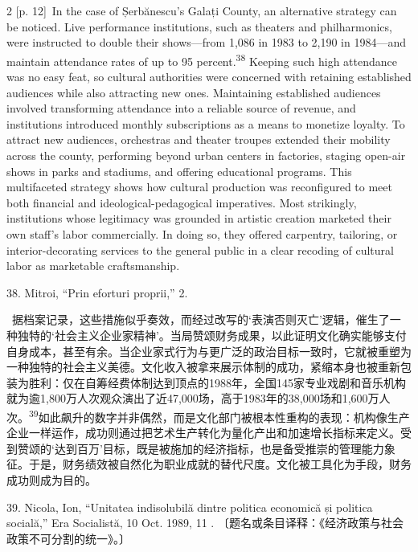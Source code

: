 \documentclass[10pt,a4paper]{article}
\begin{document}
\begin{paracol}{2}
{\scriptsize\color{gray} [p. 12]}\ In the case of Șerbănescu’s Galați County, an alternative strategy can be noticed. Live performance institutions, such as theaters and philharmonics, were instructed to double their shows—from 1,086 in 1983 to 2,190 in 1984—and maintain attendance rates of up to 95 percent.\nobreak\textsuperscript{38} Keeping such high attendance was no easy feat, so cultural authorities were concerned with retaining established audiences while also attracting new ones. Maintaining established audiences involved transforming attendance into a reliable source of revenue, and institutions introduced monthly subscriptions as a means to monetize loyalty. To attract new audiences, orchestras and theater troupes extended their mobility across the county, performing beyond urban centers in factories, staging open-air shows in parks and stadiums, and offering educational programs. This multifaceted strategy shows how cultural production was reconfigured to meet both financial and ideological-pedagogical imperatives. Most strikingly, institutions whose legitimacy was grounded in artistic creation marketed their own staff’s labor commercially. In doing so, they offered carpentry, tailoring, or interior-decorating services to the general public in a clear recoding of cultural labor as marketable craftsmanship.\par{\small 38. Mitroi, “Prin eforturi proprii,” 2.\par}
\switchcolumn*
{\scriptsize\color{gray} [p. 13]}\ 据档案记录，这些措施似乎奏效，而经过改写的‘表演否则灭亡’逻辑，催生了一种独特的‘社会主义企业家精神’。当局赞颂财务成果，以此证明文化确实能够支付自身成本，甚至有余。当企业家式行为与更广泛的政治目标一致时，它就被重塑为一种独特的社会主义美德。文化收入被拿来展示体制的成功，紧缩本身也被重新包装为胜利：仅在自筹经费体制达到顶点的1988年，全国145家专业戏剧和音乐机构就为逾1,800万人次观众演出了近47,000场，高于1983年的38,000场和1,600万人\mbox{次。\textsuperscript{39}}如此飙升的数字并非偶然，而是文化部门被根本性重构的表现：机构像生产企业一样运作，成功则通过把艺术生产转化为量化产出和加速增长指标来定义。受到赞颂的‘达到百万’目标，既是被施加的经济指标，也是备受推崇的管理能力象征。于是，财务绩效被自然化为职业成就的替代尺度。文化被工具化为手段，财务成功则成为目的。\par{\small 39. Nicola, Ion, “Unitatea indisolubilă dintre politica economică și politica socială,” Era Socialistă, 10 Oct. 1989, 11 . 〔题名或条目译释：《经济政策与社会政策不可分割的统一》。〕\par}
\switchcolumn

\end{paracol}
\end{document}
